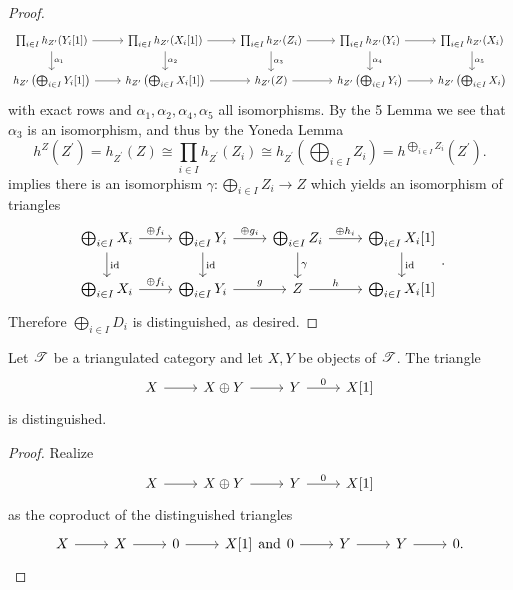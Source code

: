 \documentclass[dissertation.tex]{subfiles}
\begin{document}
\begin{prop}
\begin{proof}
    $$\begin{tikzcd} 
      \prod_{i \in I}h_{Z^\prime}(Y_i[1]) \arrow{r}\arrow{d}{\alpha_1} & \prod_{i \in I}h_{Z^\prime}(X_i[1]) \arrow{r}\arrow{d}{\alpha_2} & \prod_{i \in I}h_{Z^\prime}(Z_i) \arrow{r}\arrow{d}{\alpha_3} & \prod_{i \in I}h_{Z^\prime}(Y_i) \arrow{r}\arrow{d}{\alpha_4} & \prod_{i \in I}h_{Z^\prime}(X_i)\arrow{d}{\alpha_5}\\
      h_{Z^\prime}\left(\bigoplus_{i \in I}Y_i[1]\right) \arrow{r} & h_{Z^\prime}\left(\bigoplus_{i \in I}X_i[1]\right) \arrow{r} & h_{Z^\prime}(Z) \arrow{r} & h_{Z^\prime}\left(\bigoplus_{i \in I}Y_i\right) \arrow{r} & h_{Z^\prime}\left(\bigoplus_{i \in I} X_i\right)
    \end{tikzcd}$$
    with exact rows and $\alpha_1, \alpha_2, \alpha_4, \alpha_5$ all isomorphisms.
    By the 5 Lemma we see that $\alpha_3$ is an isomorphism, and thus by the Yoneda Lemma
    $$h^Z(Z^\prime) = h_{Z^\prime}(Z) \cong \prod_{i \in I}h_{Z^\prime}(Z_i) \cong h_{Z^\prime}\left(\bigoplus_{i \in I}Z_i\right) = h^{\bigoplus_{i \in I} Z_i}(Z^\prime).$$
    implies there is an isomorphism $\gamma : \bigoplus_{i \in I} Z_i \rightarrow Z$ which yields an isomorphism of triangles
    $$\begin{tikzcd}
      \bigoplus_{i \in I} X_i \arrow{d}{\id}\arrow{r}{\oplus f_i} & \bigoplus_{i \in I}Y_i \arrow{d}{\id}\arrow{r}{\oplus g_i} & \bigoplus_{i \in I} Z_i \arrow{d}{\gamma}\arrow{r}{\oplus h_i} & \bigoplus_{i \in I} X_i[1]\arrow{d}{\id}\\
      \bigoplus_{i \in I} X_i \arrow{r}{\oplus f_i} & \bigoplus_{i \in I}Y_i \arrow{r}{g} & Z \arrow{r}{h} & \bigoplus_{i \in I} X_i[1]
    \end{tikzcd}.$$
    Therefore $\bigoplus_{i \in I}D_i$ is distinguished, as desired.
  \end{proof}
\end{prop}

\begin{cor}\label{corsumtriangles}
  Let $\mathscr{T}$ be a triangulated category and let $X,Y$ be objects of $\mathscr{T}$.
  The triangle
  $$\begin{tikzcd}
    X \arrow{r} & X \oplus Y \arrow{r} & Y \arrow{r}{0} & X[1]
  \end{tikzcd}$$
  is distinguished.
  
  \begin{proof}
    Realize 
    $$\begin{tikzcd}
      X \arrow{r} & X \oplus Y \arrow{r} & Y \arrow{r}{0} & X[1]
    \end{tikzcd}$$
    as the coproduct of the distinguished triangles
    $$\begin{tikzcd}
      X \arrow{r} & X \arrow{r} & 0\arrow{r} & X[1]
    \end{tikzcd}
    \text{and}
    \begin{tikzcd}
      0 \arrow{r} & Y \arrow{r} & Y \arrow{r} & 0.
    \end{tikzcd}$$
  \end{proof}
\end{cor}
\end{document}

